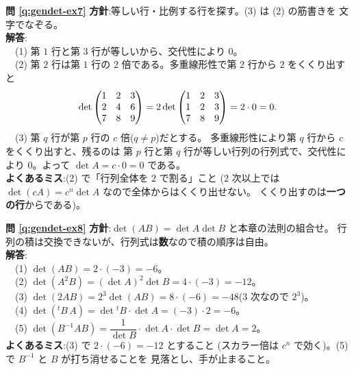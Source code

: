\bigskip
\noindent\textbf{問 \ref{q:gendet-ex7}}\quad
\textbf{方針}:等しい行・比例する行を探す。(3) は (2) の筋書きを
文字でなぞる。\\
\textbf{解答}:\\
　(1) 第 $1$ 行と第 $3$ 行が等しいから、交代性により $0$。\\
　(2) 第 $2$ 行は第 $1$ 行の $2$ 倍である。多重線形性で第 $2$ 行から
$2$ をくくり出すと
\[
\det \begin{pmatrix}1 & 2 & 3 \\ 2 & 4 & 6 \\ 7 & 8 & 9\end{pmatrix}
= 2 \det \begin{pmatrix}1 & 2 & 3 \\ 1 & 2 & 3 \\ 7 & 8 & 9\end{pmatrix} = 2 \cdot 0 = 0.
\]
　(3) 第 $q$ 行が第 $p$ 行の $c$ 倍($q \neq p$)だとする。
多重線形性により第 $q$ 行から $c$ をくくり出すと、残るのは
第 $p$ 行と第 $q$ 行が等しい行列の行列式で、交代性により $0$。よって
$\det A = c \cdot 0 = 0$ である。\\
\textbf{よくあるミス}:(2) で「行列全体を $2$ で割る」こと
($2$ 次以上では $\det(cA) = c^n \det A$ なので全体からはくくり出せない。
くくり出すのは\textbf{一つの行}からである)。

\bigskip
\noindent\textbf{問 \ref{q:gendet-ex8}}\quad
\textbf{方針}:$\det(AB) = \det A \det B$ と本章の法則の組合せ。
行列の積は交換できないが、行列式は\textbf{数}なので積の順序は自由。\\
\textbf{解答}:\\
　(1) $\det(AB) = 2 \cdot (-3) = -6$。\\
　(2) $\det(A^2 B) = (\det A)^2 \det B = 4 \cdot (-3) = -12$。\\
　(3) $\det(2AB) = 2^3 \det(AB) = 8 \cdot (-6) = -48$($3$ 次なので $2^3$)。\\
　(4) $\det({}^t\!B\,A) = \det {}^t\!B \cdot \det A = (-3) \cdot 2 = -6$。\\
　(5) $\det(B^{-1}AB) = \dfrac{1}{\det B} \cdot \det A \cdot \det B = \det A = 2$。\\
\textbf{よくあるミス}:(3) で $2 \cdot (-6) = -12$ とすること
(スカラー倍は $c^n$ で効く)。(5) で $B^{-1}$ と $B$ が打ち消せることを
見落とし、手が止まること。


